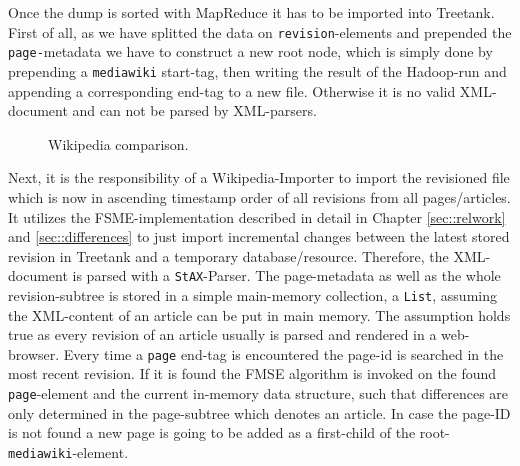 Once the dump is sorted with MapReduce it has to be imported into Treetank. First of all, as we have splitted the data on \texttt{revision}-elements and pre\-pen\-ded the \texttt{page-}metadata we have to construct a new root node, which is simply done by prepending a \texttt{mediawiki} start-tag, then writing the result of the Hadoop-run and appending a corresponding end-tag to a new file. Otherwise it is no valid XML-document and can not be parsed by XML-parsers.

\begin{figure}[tb]
\caption{\label{fig:wikivis} Wikipedia comparison.}
\end{figure}

Next, it is the responsibility of a Wikipedia-Importer to import the revisioned file which is now in ascending timestamp order of all revisions from all pages/articles. It utilizes the FSME-implementation described in detail in Chapter \ref{sec::relwork} and \ref{sec::differences} to just import incremental changes between the latest stored revision in Treetank and a temporary database/resource. Therefore, the XML-document is parsed with a \texttt{StAX}-Parser. The page-metadata as well as the whole revision-subtree is stored in a simple main-memory collection, a \texttt{List}, assuming the XML-content of an article can be put in main memory. The assumption holds true as every revision of an article usually is parsed and rendered in a web-browser. Every time a \texttt{page} end-tag is encountered the page-id is searched in the most recent revision. If it is found the FMSE algorithm is invoked on the found \texttt{page}-element and the current in-memory data structure, such that differences are only determined in the page-subtree which denotes an article. In case the page-ID is not found a new page is going to be added as a first-child of the root- \texttt{mediawiki}-element.

